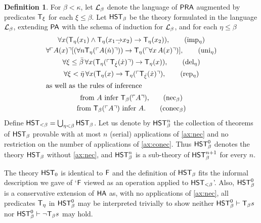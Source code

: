 \documentclass[UKenglish,cleveref,DIV=12]{scrartcl}
\theoremstyle{definition}
\newtheorem{definition}[lemma]{Definition}
\theoremstyle{definition}
\begin{document}
\begin{definition}%
For $\beta<\kappa$, let $\mathcal{L}_\beta$ denote the language of $\mathsf{PRA}$ augmented by
predicates  $\mathsf{T}_\xi$ for each $\xi\le\beta$. Let $\mathsf{HST}_\beta$ be the theory
formulated in the language $\mathcal{L}_\beta$, extending $\mathsf{PA}$ with the schema of
induction for $\mathcal{L}_\beta$, and for each $\eta\le\beta$
\begin{gather}
  \forall x(\T_\eta(x_1)\land \T_\eta(x_1\dimplies x_2)\rightarrow \T_\eta(x_2)),
	  \tag{\Imp{\eta}}\label{ax:imp}\\
  \forall\gn {A(x)}[(\forall n \T_\eta(\gn{A(\dot n)}))\rightarrow
	\T_{\eta}(\gn{\forall x \,A(x)})],
	  \tag{uni$_\eta$}\label{ax:uni}\\
  \forall \xi\le\bar\beta\,\forall x( \T_\eta(\gn{\T_{\dot{\xi}}(\dot
	x)})\rightarrow \T_\eta(x)),
	  \tag{\Del{\eta}}\label{ax:del}\\
  \forall \xi<\bar\eta \,\forall x(\T_\eta(x)\rightarrow\T_\eta(\gn{
	  \T_{\dot{\xi}}(\dot x)}),
	  \tag{\Rep{\eta}}\label{ax:rep}\\
\intertext{as well as the rules of inference}
  \text{from $A$ infer $\T_\beta(\gn A)$,}\tag{nec$_\beta$}
	  \label{ax:nec}\\
  \text{from $\T_\beta(\gn A)$ infer $A$.}\tag{conec$_\beta$}
	  \label{ax:conec}
\end{gather}
Define $\mathsf{HST}_{<\beta}=\bigcup_{\eta<\beta}\mathsf{HST}_\beta$. Let us denote by $\mathsf{HST}_\beta^n$
the collection of theorems of $\mathsf{HST}_\beta$ provable with at most $n$ (serial) applications
of \eqref{ax:nec} and no restriction on the number of applications of
\eqref{ax:conec}. 
Thus $\mathsf{HST}_\beta^0$ denotes the theory $\mathsf{HST}_\beta$ without
\eqref{ax:nec}, and
$\mathsf{HST}_\beta^n$ is a sub-theory of $\mathsf{HST}_\beta^{n+1}$ for every $n$.
\end{definition}

The theory $\mathsf{HST}_0$ is identical to $\mathsf{F}$ and the definition of $\mathsf{HST}_{\beta}$ fits
the informal description we gave of `$\mathsf{F}$ viewed as an operation applied to
$\mathsf{HST}_{<\beta}$'. Also, $\mathsf{HST}_\beta^0$ is a conservative extension of
$\mathsf{HA}$ as, with no applications of \eqref{ax:nec}, all predicates $\mathsf{T}_\eta$ in
$\mathsf{HST}_\beta^0$ may be interpreted trivially to show neither $\mathsf{HST}_\beta^0\vdash
\mathsf{T}_\beta s$ nor $\mathsf{HST}_\beta^0\vdash \lnot \mathsf{T}_\beta s$ may hold.
\end{document}
